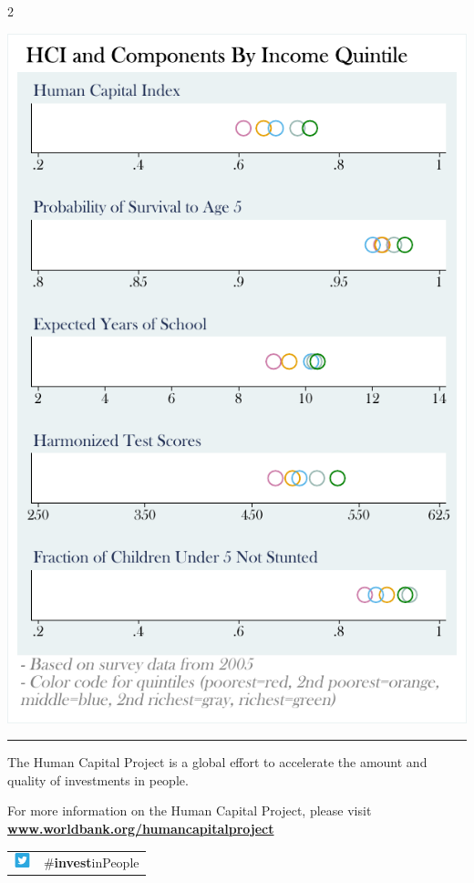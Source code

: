 \documentclass[8pt,]{article}
\begin{document}
\begin {multicols}{2}
\begin{flushright}\includegraphics[width=1\linewidth]{charts/ses_MDA} \end{flushright}

\noindent

\rule{9cm}{0.4pt}

The Human Capital Project is a global effort to accelerate the amount
and quality of investments in people. ~

For more information on the Human Capital Project, please visit
\textbf{\href{https://www.worldbank.org/humancapitalproject}{www.worldbank.org/humancapitalproject}}

\begin{table}[H]
\begin{tabular}{ll}
\includegraphics[width=0.5cm]{static/twitter.png} & \#\textbf{invest}inPeople   \\
\end{tabular}
\end{table}

\end {multicols}
\end{document}
